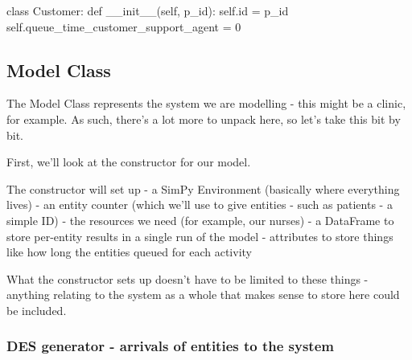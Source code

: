 \documentclass[
  letterpaper,
  DIV=11,
  numbers=noendperiod]{scrreprt}
\newenvironment{Shaded}{\begin{snugshade}}{\end{snugshade}}
\newcommand{\BuiltInTok}[1]{\textcolor[rgb]{0.00,0.23,0.31}{#1}}
\newcommand{\DecValTok}[1]{\textcolor[rgb]{0.68,0.00,0.00}{#1}}
\newcommand{\FunctionTok}[1]{\textcolor[rgb]{0.28,0.35,0.67}{#1}}
\newcommand{\KeywordTok}[1]{\textcolor[rgb]{0.00,0.23,0.31}{#1}}
\newcommand{\NormalTok}[1]{\textcolor[rgb]{0.00,0.23,0.31}{#1}}
\newcommand{\OperatorTok}[1]{\textcolor[rgb]{0.37,0.37,0.37}{#1}}
\newcommand{\VariableTok}[1]{\textcolor[rgb]{0.07,0.07,0.07}{#1}}
\begin{document}
\begin{tcolorbox}[enhanced jigsaw, rightrule=.15mm, colback=white, colframe=quarto-callout-note-color-frame, colbacktitle=quarto-callout-note-color!10!white, toprule=.15mm, coltitle=black, opacityback=0, titlerule=0mm, bottomtitle=1mm, breakable, title=\textcolor{quarto-callout-note-color}{\faInfo}\hspace{0.5em}{Example entity class}, opacitybacktitle=0.6, toptitle=1mm, arc=.35mm, bottomrule=.15mm, leftrule=.75mm, left=2mm]

\begin{Shaded}
\begin{Highlighting}[]
\KeywordTok{class}\NormalTok{ Customer:}
    \KeywordTok{def} \FunctionTok{\_\_init\_\_}\NormalTok{(}\VariableTok{self}\NormalTok{, p\_id):}
        \VariableTok{self}\NormalTok{.}\BuiltInTok{id} \OperatorTok{=}\NormalTok{ p\_id}
        \VariableTok{self}\NormalTok{.queue\_time\_customer\_support\_agent }\OperatorTok{=} \DecValTok{0}
\end{Highlighting}
\end{Shaded}

\end{tcolorbox}

\subsection{Model Class}\label{model-class}

The Model Class represents the system we are modelling - this might be a
clinic, for example. As such, there's a lot more to unpack here, so
let's take this bit by bit.

First, we'll look at the constructor for our model.

The constructor will set up - a SimPy Environment (basically where
everything lives) - an entity counter (which we'll use to give entities
- such as patients - a simple ID) - the resources we need (for example,
our nurses) - a DataFrame to store per-entity results in a single run of
the model - attributes to store things like how long the entities queued
for each activity

What the constructor sets up doesn't have to be limited to these things
- anything relating to the system as a whole that makes sense to store
here could be included.

\subsubsection{DES generator - arrivals of entities to the
system}\label{des-generator---arrivals-of-entities-to-the-system}
\end{document}
